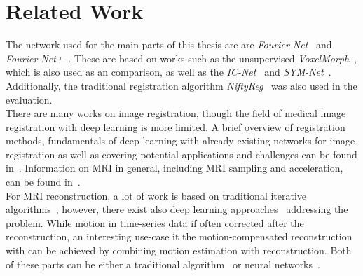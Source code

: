 \documentclass[english,version-2022-01]{uzl-thesis} %
\begin{document}
\section{Related Work} \label{Sec:RelatedWork}
The network used for the main parts of this thesis are are \emph{Fourier-Net}~\cite{Fourier-Net} and \emph{Fourier-Net+}~\cite{Fourier-Net+}. These are based on works such as the unsupervised \emph{VoxelMorph}~\cite{Voxelmorph}, which is also used as an comparison, as well as the \emph{IC-Net}~\cite{IC-Net} and \emph{SYM-Net}~\cite{SYM-Net}. Additionally, the traditional registration algorithm \emph{NiftyReg}~\cite{NiftiReg} was also used in the evaluation.\\
There are many works on image registration, though the field of medical image registration with deep learning is more limited. A brief overview of registration methods, fundamentals of deep learning with already existing networks for image registration as well as covering potential applications and challenges can be found in~\cite{Chen2020,Haskins2020,Fu2020,Zou2022,Chen2023}. Information on MRI in general, including MRI sampling and acceleration, can be found in~\cite{Serai2021,SamplingStrategies,PulseSequences,AdvancesPI,CS-MRI}.\\
For MRI reconstruction, a lot of work is based on traditional iterative algorithms~\cite{AdvancesPI,CS-MRI,ParallelMRI,GRAPPA}, however, there exist also deep learning approaches~\cite{DeepMRIReconstructionRadialSubsampling,DeepMRIReconstructionSubsampling}
addressing the problem. While motion in time-series data if often corrected after the reconstruction, an interesting use-case it the motion-compensated reconstruction with can be achieved by combining motion estimation with reconstruction. Both of these parts can be either a traditional algorithm~\cite{GRICS} or neural networks~\cite{Pan2024,Zou2024}.
\end{document}
